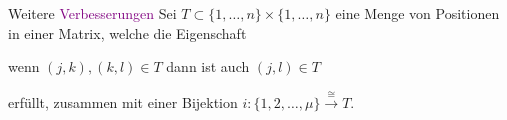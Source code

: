 \begin{frame}{Weitere \textcolor{purple}{Verbesserungen}}
  Sei $T\subset\{1,\dots,n\}\times\{1,\dots,n\}$ eine Menge von Positionen in
  einer Matrix, welche die Eigenschaft
  \begin{einr}
    wenn $(j,k),(k,l)\in T$ dann ist auch $(j,l)\in T$
  \end{einr}
  erfüllt, zusammen mit einer Bijektion
  $i:\{1,2,\dots,\mu\}\overset{\cong}{\longrightarrow}T$.
\end{frame}
